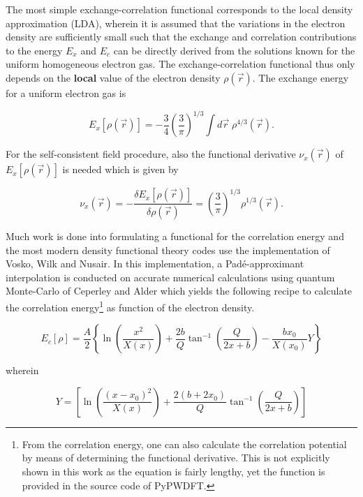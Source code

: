 The most simple exchange-correlation functional corresponds to the local density approximation (LDA), wherein it is assumed that the variations in the electron density are sufficiently small such that the exchange and correlation contributions to the energy $E_{x}$ and $E_{c}$ can be directly derived from the solutions known for the uniform homogeneous electron gas. The exchange-correlation functional thus only depends on the \textbf{local} value of the electron density $\rho(\vec{r})$. The exchange energy for a uniform electron gas is

\begin{equation}
E_{x}[\rho(\vec{r})] = -\frac{3}{4}\left(\frac{3}{\pi}\right)^{1/3} \int d\vec{r}\; \rho^{4/3}(\vec{r}).
\label{eq:chap04:slater_exchange}
\end{equation}

For the self-consistent field procedure, also the functional derivative $\nu_{x}(\vec{r})$ of $E_{x}[\rho(\vec{r})]$ is needed which is given by

\begin{equation}
\nu_{x}(\vec{r}) = -\frac{\delta E_{x}[\rho(\vec{r})]}{\delta \rho(\vec{r})} = \left(\frac{3}{\pi}\right)^{1/3} \rho^{1/3}(\vec{r}).
\end{equation}

Much work is done into formulating a functional for the correlation energy and the most modern density functional theory codes use the implementation of Vosko, Wilk and Nusair. In this implementation, a Padé-approximant interpolation is conducted on accurate numerical calculations using quantum Monte-Carlo of Ceperley and Alder which yields the following recipe to calculate the correlation energy\footnote{From the correlation energy, one can also calculate the correlation potential by means of determining the functional derivative. This is not explicitly shown in this work as the equation is fairly lengthy, yet the function is provided in the source code of PyPWDFT.} as function of the electron density.\cite{1980:vosko,1980:ceperley}

\begin{equation}
E_{c}[\rho] = \frac{A}{2} \left\{ \ln \left( \frac{x^{2}}{X(x)} \right) + \frac{2b}{Q} \tan^{-1} \left( \frac{Q}{2x+b} \right) -\frac{bx_{0}}{X(x_{0})} Y \right\}
\label{eq:vwn5}
\end{equation}

wherein

\begin{equation}
    Y = \left[ \ln \left( \frac{(x-x_{0})^{2}}{X(x)} \right) + \frac{2(b+2x_{0})}{Q} \tan^{-1} \left( \frac{Q}{2x+b} \right) \right]
\end{equation}

